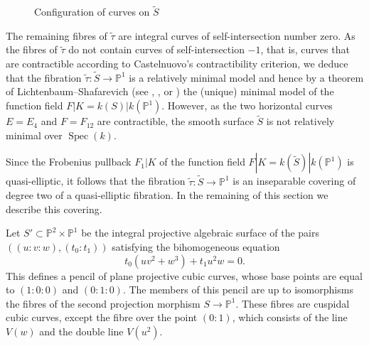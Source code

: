 \documentclass[12pt,reqno]{amsart}
\theoremstyle{definition}
\newcommand{\su}{\subset}
\newcommand{\wt}{\widetilde}
\newcommand{\PP}{\mathbb{P}}
\DeclareMathOperator{\Spec}{Spec}%
\begin{document}
\begin{figure}[h]
\caption{Configuration of curves on $\wt S$}\label{2024_07_23_20:15}
\end{figure}

The remaining fibres of $\wt \tau$ are integral curves of self-intersection number zero.
As the fibres of $\wt \tau$ do not contain curves of self-intersection $-1$, that is, curves that are contractible according to Castelnuovo's contractibility criterion, we deduce that the fibration $\wt \tau: \wt S \to \PP^1$ is a relatively minimal model and hence by a theorem of Lichtenbaum--Shafarevich (see \cite[Theorem~4.4]{Lic68}, \cite[p.\,155]{Sha66}, or \cite[p.\,422]{Liu02}) the (unique) minimal model of the function field $F|K = k(S)|k(\PP^1)$.
However, as the two horizontal curves $E=E_4$ and $F=F_{12}$ are contractible, the smooth surface $\wt S$ is not relatively minimal over $\Spec(k)$.

Since the Frobenius pullback $F_1|K$ of the function field $F|K = k(\wt S)|k(\PP^1)$ is quasi-elliptic, it follows that the fibration $\wt \tau: \wt S \to \PP^1$ is an inseparable covering of degree two of a quasi-elliptic fibration.
In the remaining of this section we describe this covering.


Let $S' \su \PP^2 \times \PP^1$ be the integral projective algebraic surface of the pairs $((u:v:w),(t_0:t_1))$ satisfying the bihomogeneous equation
\[ t_0 (u v^2 + w^3) + t_1 u^2 w = 0. \]
This defines a pencil of plane projective cubic curves, whose base points are equal to $(1:0:0)$ and $(0:1:0)$.
The members of this pencil are up to isomorphisms the fibres of the second projection morphism $S\to \PP^1$.
These fibres are cuspidal cubic curves, except the fibre over the point $(0:1)$, which consists of the line $V(w)$ and the double line $V(u^2)$.
\end{document}
